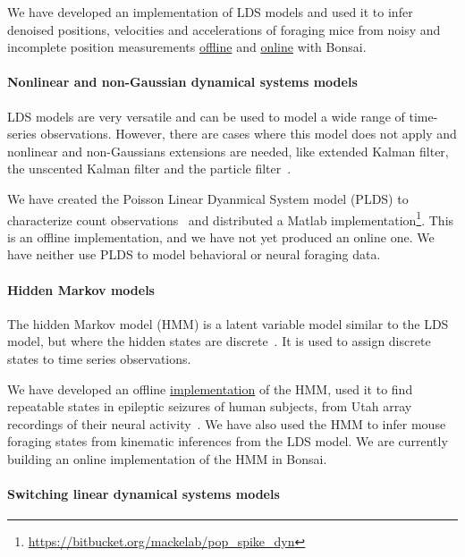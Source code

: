 We have developed an implementation of LDS models and used it to infer denoised
positions, velocities and accelerations of foraging mice from noisy and
incomplete position measurements
\href{https://joacorapela.github.io/lds\_python/auto\_examples/tracking/plotFilterFWGMouseTrajectoryManualVsLearnedParams.html}{offline}
and
\href{https://bonsai-rx.org/machinelearning/examples/examples/LinearDynamicalSystems/Kinematics/ForagingMouse/README.html}{online}
with Bonsai.

\paragraph{Nonlinear and non-Gaussian dynamical systems models}

LDS models are very versatile and can be used to model a wide range of
time-series observations. However, there are cases where this model does not
apply and nonlinear and non-Gaussians extensions are needed, like extended
Kalman filter, the unscented Kalman filter and the particle
filter~\citep[][part II]{durbinAndKoopman12}.

We have created the Poisson Linear Dyanmical System model (PLDS) to characterize count
observations~\citep{mackeEtAl15} and distributed a Matlab
implementation\footnote{\url{https://bitbucket.org/mackelab/pop\_spike\_dyn}}.
This is an offline implementation, and we have not yet produced an online one.
We have neither use PLDS to model behavioral or neural foraging data.

\paragraph{Hidden Markov models}

The hidden Markov model (HMM) is a latent variable model similar to the LDS
model, but where the hidden states are discrete~\citep[][Chapter 13]{bishop06}. It is
used to assign discrete states to time series observations.

We have developed an offline
\href{https://github.com/joacorapela/hiddenMarkovModels}{implementation} of the
HMM, used it to find repeatable states in epileptic seizures of human subjects,
from Utah array recordings of their neural
activity~\citep{rapelaAndTodorovToBeSubmitted}. We have also used the HMM to
infer mouse foraging states from kinematic inferences from the LDS model. We
are currently building an online implementation of the HMM in Bonsai.

\paragraph{Switching linear dynamical systems models}

